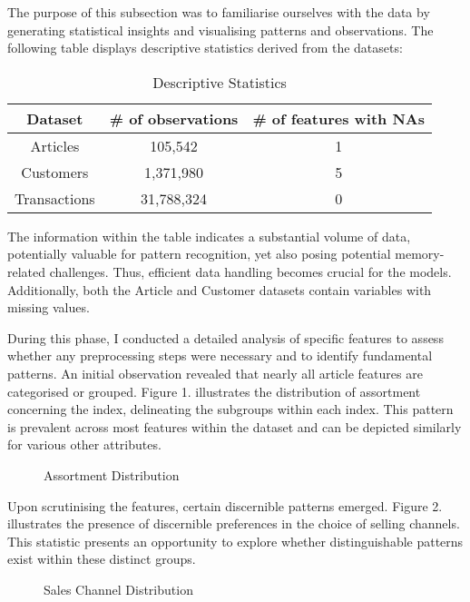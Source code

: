 \documentclass[conference,compsoc]{IEEEtran}
\begin{document}
The purpose of this subsection was to familiarise ourselves with the data by generating statistical insights and visualising patterns and observations. The following table displays descriptive statistics derived from the datasets:
\begin{table}[htbp]
    \centering
    \caption{Descriptive Statistics}
    \begin{tabular}{|c|c|c|}
        \hline
        Dataset & \# of observations & \# of features with NAs \\
        \hline
        Articles & 105,542 & 1 \\
        Customers & 1,371,980 & 5 \\
        Transactions & 31,788,324 & 0 \\
        \hline
    \end{tabular}
    \label{tab:example}
\end{table}

The information within the table indicates a substantial volume of data, potentially valuable for pattern recognition, yet also posing potential memory-related challenges. Thus, efficient data handling becomes crucial for the models. Additionally, both the Article and Customer datasets contain variables with missing values.

During this phase, I conducted a detailed analysis of specific features to assess whether any preprocessing steps were necessary and to identify fundamental patterns. An initial observation revealed that nearly all article features are categorised or grouped. Figure 1. illustrates the distribution of assortment concerning the index, delineating the subgroups within each index. This pattern is prevalent across most features within the dataset and can be depicted similarly for various other attributes.

\begin{figure}[htbp]
    \centering
    \caption{Assortment Distribution}
    \label{fig:example}
\end{figure}

Upon scrutinising the features, certain discernible patterns emerged. Figure 2. illustrates the presence of discernible preferences in the choice of selling channels. This statistic presents an opportunity to explore whether distinguishable patterns exist within these distinct groups.

\begin{figure}[htbp]
    \centering
    \caption{Sales Channel Distribution}
    \label{fig:example}
\end{figure}
\end{document}
